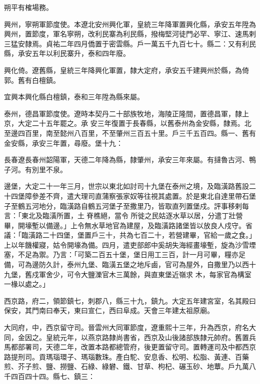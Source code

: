 \begin{pinyinscope}
 朔平有榷場務。



 興州，寧朔軍節度使。本遼北安州興化軍，皇統三年降軍置興化縣，承安五年陞為興州，置節度，軍名寧朔，改利民寨為利民縣，撥梅堅河徒門必罕、寧江、速馬剌三猛安隸焉。貞祐二年四月僑置于密雲縣。戶一萬五千九百七十。縣二：又有利民縣，承安五年以利民寨升，泰和四年廢。



 興化倚。遼舊縣，皇統三年降興化軍置，隸大定府，承安五千建興州於縣，為倚郭。舊有白檀鎮。



 宜興本興化縣白檀鎮，泰和三年陞為縣來屬。



 泰州，德昌軍節度使。遼時本契丹二十部族牧地，海陵正隆間，置德昌軍，隸上京，大定二十五年罷之。承
 安三年復置于長春縣，以舊泰州為金安縣，隸焉。北至邊四百里，南至懿州八百里，不至肇州三百五十里。戶三千五百四。縣一、舊有金安縣，承安三年置，尋廢。堡十九：



 長春遼長春州韶陽軍，天德二年降為縣，隸肇州，承安三年來屬。有撻魯古河、鴨子河。有別里不泉。



 邊堡，大定二十一年三月，世宗以東北如討司十九堡在泰州之境，及臨潢路舊設二十四堡障參差不齊，遣大理司直蒲察張家奴等往視其處置。於是東北自達里帶石堡子至鶴五河地分，臨潢路自鶴五河堡子至撒里乃，皆取直列置堡戍。評事移剌每言：「東北及臨潢所置，土脊樵絕，當令
 所徙之民姑逐水草以居，分遣丁壯營畢，開壕塹以備邊。」上令無水草地官為建屋，及臨潢路諸堡皆以放良人戍守。省議：「臨潢路二十四堡，堡置戶三十，共為七百二十，若營建畢，官給一歲之食。」上以年饑權寢，姑令開壕為備。四月，遣吏部郎中奚胡失海經畫壕塹，旋為沙雪堙塞，不足為禦。乃言：「可築二百五十堡，堡日用工三百，計一月可畢，糧亦足備，可為邊防久計，泰州九堡、臨潢五堡之地斥鹵，官可為屋外，自撒里乃以西十九堡，舊戍軍舍少，可令大鹽濼官木三萬餘，與直東堡近嶺求
 木，每家官為構室一椽以處之。」



 西京路，府二，領節鎮七，刺郡八，縣三十九，鎮九。大定五年建宮室，名其殿曰保安，其門南曰奉天，東曰宣仁，西曰阜成。天會三年建太祖原廟。



 大同府，中，西京留守司。晉雲州大同軍節度，遼重熙十三年，升為西京，府名大同，金因之。皇統元年，以燕京路隸尚書省，西京及山後諸部族隸元帥府。舊置兵馬都部署司，天德二年，改置本路都總管府，後更置留守司。置轉運司及中都西京路提刑司。貢瑪瑙環子、瑪瑙數珠。產白駝、安息香、松明、松脂、黃連、百藥煎、芥子煎、鹽、撈鹽、石綠、綠礬、鐵、甘草、枸杞、碾玉砂、地蕈。戶九萬八千四百四十四。縣七、鎮三：




\end{pinyinscope}

